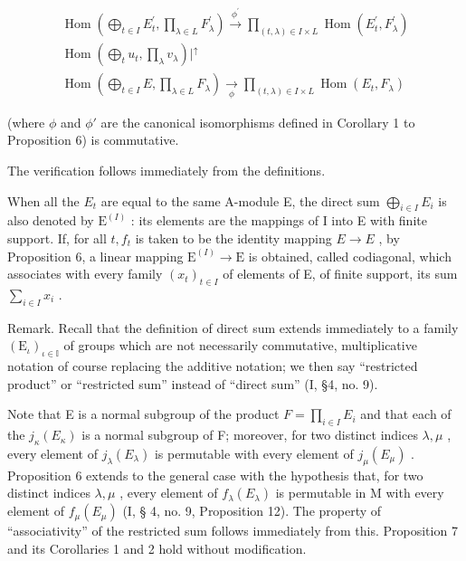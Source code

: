 \[
\begin{array}{c} \operatorname{Hom} \left(\bigoplus_ {t \in I} E _ {t} ^ {\prime}, \prod_ {\lambda \in L} F _ {\lambda} ^ {\prime}\right) \xrightarrow {\phi^ {\prime}} \prod_ {(t, \lambda) \in I \times L} \operatorname{Hom} (E _ {t} ^ {\prime}, F _ {\lambda} ^ {\prime}) \\ \operatorname{Hom} \left(\bigoplus_ {t} u _ {t}, \prod_ {\lambda} v _ {\lambda}\right) \Bigg | ^ {\uparrow} \\ \operatorname{Hom} \left(\bigoplus_ {t \in I} E, \prod_ {\lambda \in L} F _ {\lambda}\right) \xrightarrow [ \phi ]{\quad} \prod_ {(t, \lambda) \in I \times L} \operatorname{Hom} (E _ {t}, F _ {\lambda}) \end{array}
\]

(where \(\phi\) and \(\phi'\) are the canonical isomorphisms defined in Corollary 1 to Proposition 6) is commutative.

The verification follows immediately from the definitions.

When all the \(E_{t}\) are equal to the same A-module E, the direct sum \(\bigoplus_{i\in I}E_{i}\) is also denoted by \(\mathrm{E}^{(I)}\) : its elements are the mappings of I into E with finite support. If, for all \(t,f_{t}\) is taken to be the identity mapping \(E\to E\) , by Proposition 6, a linear mapping \(\mathrm{E}^{(I)}\to\mathrm{E}\) is obtained, called codiagonal, which associates with every family \((x_{t})_{t\in I}\) of elements of E, of finite support, its sum \(\sum_{i\in I}x_{i}\) .

Remark. Recall that the definition of direct sum extends immediately to a family \((\mathrm{E}_{\iota})_{\iota\in\mathbb{I}}\) of groups which are not necessarily commutative, multiplicative notation of course replacing the additive notation; we then say ``restricted product'' or ``restricted sum'' instead of ``direct sum'' (I, §4, no. 9).

Note that E is a normal subgroup of the product \(F = \prod_{i \in I} E_{i}\) and that each of the \(j_{\kappa}(E_{\kappa})\) is a normal subgroup of F; moreover, for two distinct indices \(\lambda, \mu\) , every element of \(j_{\lambda}(E_{\lambda})\) is permutable with every element of \(j_{\mu}(E_{\mu})\) . Proposition 6 extends to the general case with the hypothesis that, for two distinct indices \(\lambda, \mu\) , every element of \(f_{\lambda}(E_{\lambda})\) is permutable in M with every element of \(f_{\mu}(E_{\mu})\) (I, § 4, no. 9, Proposition 12). The property of ``associativity'' of the restricted sum follows immediately from this. Proposition 7 and its Corollaries 1 and 2 hold without modification.

